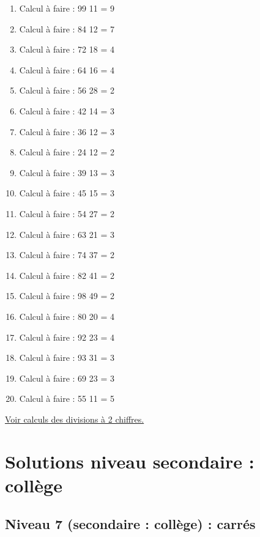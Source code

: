 \documentclass[11pt]{article}
\begin{document}
\begin{enumerate}
\item Calcul à faire :  99 \textdiv{} 11 =  9
\item Calcul à faire :  84 \textdiv{} 12 = 7
\item Calcul à faire :  72 \textdiv{} 18 = 4
\item Calcul à faire :  64 \textdiv{} 16 = 4
\item Calcul à faire :  56 \textdiv{} 28 = 2
\item Calcul à faire :  42 \textdiv{} 14 = 3
\item Calcul à faire :  36 \textdiv{} 12 = 3
\item Calcul à faire :  24 \textdiv{} 12 = 2
\item Calcul à faire :  39 \textdiv{} 13 = 3
\item Calcul à faire :  45 \textdiv{} 15 = 3
\item Calcul à faire :  54 \textdiv{} 27 =  2
\item Calcul à faire :  63 \textdiv{} 21 = 3
\item Calcul à faire :  74 \textdiv{} 37 = 2
\item Calcul à faire :  82 \textdiv{} 41 = 2
\item Calcul à faire :  98 \textdiv{} 49 = 2
\item Calcul à faire :  80 \textdiv{} 20 = 4
\item Calcul à faire :  92 \textdiv{} 23 = 4
\item Calcul à faire :  93 \textdiv{} 31 = 3
\item Calcul à faire :  69 \textdiv{} 23 = 3
\item Calcul à faire :  55 \textdiv{} 11 = 5
\end{enumerate}




\hyperref[org2969313]{Voir calculs des divisions à 2 chiffres.}


\newpage


\section{Solutions niveau secondaire : collège}
\label{sec:org1be4090}

\subsection{Niveau 7 (secondaire : collège) : carrés}
\label{sec:org933e61d}
\end{document}
